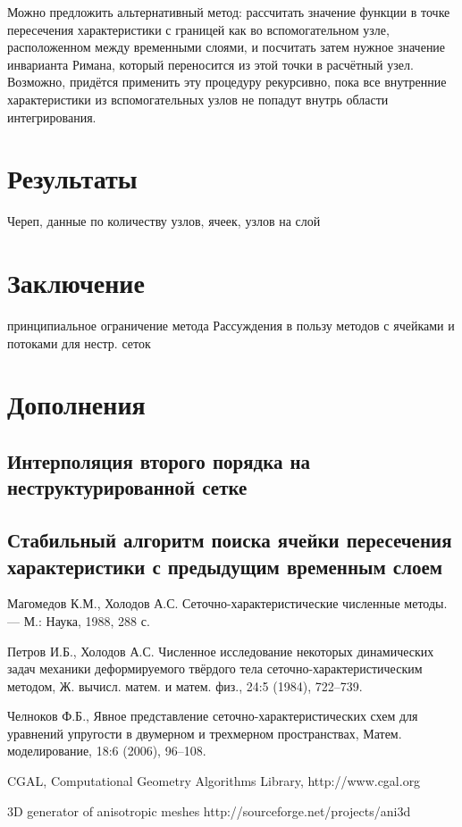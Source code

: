 Можно предложить альтернативный метод: рассчитать значение функции в точке пересечения 
характеристики с границей как во вспомогательном узле, 
расположенном между временными слоями, и посчитать затем нужное значение 
инварианта Римана, который переносится из этой точки в расчётный узел. 
Возможно, придётся применить эту процедуру рекурсивно, 
пока все внутренние характеристики из вспомогательных узлов не попадут внутрь 
области интегрирования. 


\section{Результаты}
Череп, данные по количеству узлов, ячеек, узлов на слой


\section{Заключение}
 принципиальное ограничение метода 
Рассуждения в пользу методов с ячейками и потоками для нестр. сеток


\section{Дополнения}
\subsection{Интерполяция второго порядка на неструктурированной сетке }
\subsection{Стабильный алгоритм поиска 
ячейки пересечения характеристики с предыдущим временным слоем}


\begin{thebibliography}{99}

 Магомедов К.М., Холодов А.С. 
Сеточно-характеристические численные методы. — М.: Наука, 1988, 288 с.

 Петров И.Б., Холодов А.С. 
Численное исследование некоторых динамических задач механики деформируемого 
твёрдого тела сеточно-характеристическим методом, 
Ж. вычисл. матем. и матем. физ., 24:5 (1984), 722–739.

 Челноков Ф.Б., Явное представление 
сеточно-характеристических схем для уравнений упругости в двумерном и
 трехмерном пространствах, Матем. моделирование, 18:6 (2006), 96–108.

 CGAL, Computational Geometry Algorithms Library, http://www.cgal.org

 3D generator of anisotropic meshes http://sourceforge.net/projects/ani3d

\end{thebibliography}














